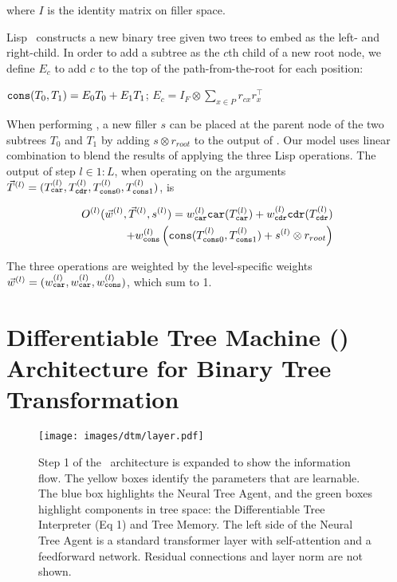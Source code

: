 where $I$ is the identity matrix on filler space.

Lisp \cons\ constructs a new binary tree given two trees to embed as the left- and right-child. In order to add a subtree as the $c$th child of a new root node, we define $E_c$ to add $c$ to the top of the path-from-the-root for each position:

$\texttt{cons}(T_0,T_1)=E_0 T_0 + E_1 T_1$;
$E_c = I_F \otimes \sum_{x \in P} r_{cx}r_x^\top$

 When performing \cons, a new filler $s$ can be placed at the parent node of the two subtrees $T_0$ and $T_1$ by adding $s \otimes r_{root}$ to the output of \cons.
Our model uses linear combination to blend the results of applying the three Lisp operations. The output of step $l\in1:L$, when operating on the arguments $\vec{T}^{(l)}=(T_{\texttt{car}}^{(l)},T_{\texttt{cdr}}^{(l)},T_{\texttt{cons} 0}^{(l)},T_{\texttt{cons}1}^{(l)})$, is\:

\begin{equation} \label{eq:dtm-output}
\begin{split}
O^{(l)}(\vec{w}^{(l)}, \vec{T}^{(l)}, s^{(l)}) = w^{(l)}_{\texttt{car}} \texttt{car}(T_{\texttt{car}}^{(l)}) + w^{(l)}_{\texttt{cdr}} \texttt{cdr}(T_{\texttt{cdr}}^{(l)}) \\ + w^{(l)}_{\texttt{cons}} \left( \texttt{cons}(T_{\texttt{cons}0}^{(l)}, T_{\texttt{cons}1}^{(l)}) +  s^{(l)} \otimes r_{root} \right)
\end{split}
\end{equation}

The three operations are weighted by the level-specific weights $\vec{w}^{(l)} = (w^{(l)}_{\texttt{car}},  w^{(l)}_{\texttt{car}}, w^{(l)}_{\texttt{cons}})$, which sum to 1.

\section{Differentiable Tree Machine (\blackboard) Architecture for Binary Tree Transformation} \label{sec:dtm-model}

\begin{figure*}[ht]
\vskip 0.2in
\begin{center}
\centerline{\texttt{[image: images/dtm/layer.pdf]}}
\caption{Step 1 of the \blackboard\ architecture is expanded to show the information flow. The yellow boxes identify the parameters that are learnable. The blue box highlights the Neural Tree Agent, and the green boxes highlight components in tree space: the Differentiable Tree Interpreter (Eq 1) and Tree Memory. The left side of the Neural Tree Agent is a standard transformer layer with self-attention and a feedforward network. Residual connections and layer norm are not shown.}
\label{architecture}
\end{center}
\vskip -0.2in
\end{figure*}

